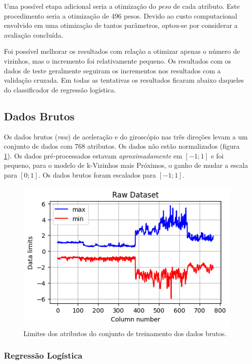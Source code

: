 \documentclass[final,5p]{elsarticle}
\numberwithin{equation}{section}
\begin{document}
        Uma possível etapa adicional seria a otimização do \emph{peso} de cada atributo. Este procedimento seria a otimização de 496 pesos. Devido ao custo computacional envolvido em uma otimização de tantos parâmetros, optou-se por considerar a avaliação concluída.

        Foi possível melhorar os resultados com relação a otimizar apenas o número de vizinhos, mas o incremento foi relativamente pequeno. Os resultados com os dados de teste geralmente seguiram os incrementos nos resultados com a validação cruzada. Em todas as tentativas os resultados ficaram abaixo daqueles do classificador de regressão logística.

    \subsection{Dados Brutos}

        Os dados brutos (\emph{raw}) de aceleração e do giroscópio nas três direções levam a um conjunto de dados com 768 atributos. Os dados não estão normalizados (figura \ref{fig:dados_brutos}). Os dados pré-processados estavam \emph{aproximadamente} em $[-1;1]$ e foi pequeno, para o modelo de k-Vizinhos mais Próximos, o ganho de mudar a escala para $[0;1]$. Os dados brutos foram escalados para $[-1;1]$.

        \begin{figure}[hbt!]
            \includegraphics[width=0.95\columnwidth]{B_Dataset_Scale.png}
            \caption{Limites dos atributos do conjunto de treinamento dos dados brutos.}
            \label{fig:dados_brutos}
        \end{figure}

    \subsubsection{Regressão Logística}
\end{document}
